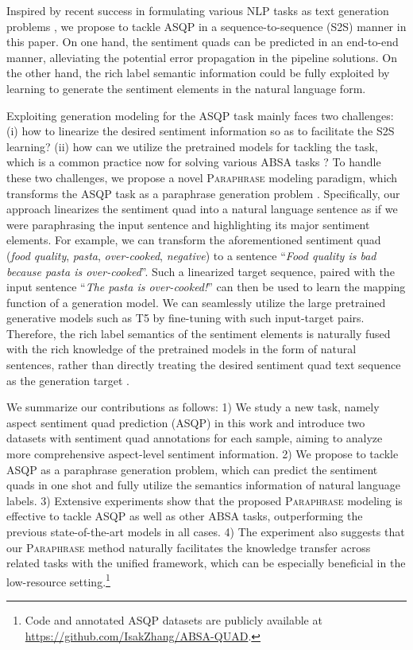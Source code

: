 \documentclass[11pt]{article}
\begin{document}
Inspired by recent success in formulating various NLP tasks as text generation problems \cite{athiwaratkun-etal-2020-augmented, iclr21-augmented, gpt-understands}, we propose to tackle ASQP in a sequence-to-sequence (S2S) manner in this paper.
On one hand, the sentiment quads can be predicted in an end-to-end manner, alleviating the potential error propagation in the pipeline solutions.
On the other hand, the rich label semantic information could be fully exploited by learning to generate the sentiment elements in the natural language form. 


Exploiting generation modeling for the ASQP task mainly faces two challenges: 
(i) how to linearize the desired sentiment information so as to facilitate the S2S learning? (ii) how can we utilize the pretrained models for tackling the task, which is a common practice now for solving various ABSA tasks \cite{emnlp20-xulu, coling20-acsa}?
To handle these two challenges, we propose a novel \textsc{Paraphrase} modeling paradigm, which transforms the ASQP task as a paraphrase generation problem \cite{cl13-paraphrase}. 
Specifically, our approach linearizes the sentiment quad into a natural language sentence as if we were paraphrasing the input sentence and highlighting its major sentiment elements.
For example, we can transform the aforementioned sentiment quad (\textit{food quality}, \textit{pasta}, \textit{over-cooked}, \textit{negative}) to a sentence ``\textit{Food quality is bad because pasta is over-cooked}''.
Such a linearized target sequence, paired with the input sentence ``\textit{The pasta is over-cooked!}'' can then be used to learn the mapping function of a generation model. We can seamlessly utilize the large pretrained generative models such as T5 \cite{t5-paper} by fine-tuning with such input-target pairs. Therefore, the rich label semantics of the sentiment elements is naturally fused with the rich knowledge of the pretrained models in the form of natural sentences, rather than directly treating the desired sentiment quad text sequence as the generation target \cite{acl21-gabsa}.


We summarize our contributions as follows:
1) We study a new task, namely aspect sentiment quad prediction (ASQP) in this work and introduce two datasets with sentiment quad annotations for each sample, aiming to analyze more comprehensive aspect-level sentiment information.
2) We propose to tackle ASQP as a paraphrase generation problem, which can predict the sentiment quads in one shot and fully utilize the semantics information of natural language labels.
3) Extensive experiments show that the proposed \textsc{Paraphrase} modeling is effective to tackle ASQP as well as other ABSA tasks, outperforming the previous state-of-the-art models in all cases.
4) The experiment also suggests that our \textsc{Paraphrase} method naturally facilitates the knowledge transfer across related tasks with the unified framework, which can be especially beneficial in the low-resource setting.\footnote{Code and annotated ASQP datasets are publicly available at \url{https://github.com/IsakZhang/ABSA-QUAD}.} 
\end{document}
